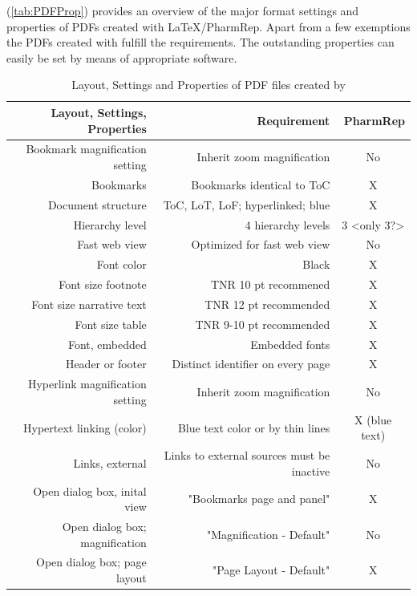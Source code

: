 (\autoref{tab:PDFProp}) provides an overview of the major format settings and properties of PDFs created with \LaTeX{}/PharmRep. Apart from a few exemptions the PDFs created with \PharmRep fulfill the requirements. The outstanding properties can easily be set by means of appropriate software.
\begin{table}[htbp]
\centering
\caption{Layout, Settings and Properties of PDF files created by \PharmRep}\label{tab:PDFProp}
\begin{tabular}{rrr}
\toprule
Layout, Settings, Properties & Requirement & PharmRep \\
\midrule
Bookmark magnification setting  & Inherit zoom magnification & \multicolumn{1}{c}{No} \\
Bookmarks & Bookmarks identical to ToC & \multicolumn{1}{c}{X} \\
Document structure & ToC, LoT, LoF; hyperlinked; blue  & \multicolumn{1}{c}{X} \\
Hierarchy level & 4 hierarchy levels & \multicolumn{1}{c}{3 <only 3?>} \\
Fast web view  & Optimized for fast web view & \multicolumn{1}{c}{No} \\
Font color & Black  & \multicolumn{1}{c}{X} \\
Font size footnote & TNR 10 pt recommened & \multicolumn{1}{c}{X} \\
Font size narrative text & TNR 12 pt recommended & \multicolumn{1}{c}{X} \\
Font size table & TNR 9-10 pt recommended & \multicolumn{1}{c}{X} \\
Font, embedded & Embedded fonts  & \multicolumn{1}{c}{X} \\
Header or footer & Distinct identifier on every page & \multicolumn{1}{c}{X} \\
Hyperlink magnification setting & Inherit zoom magnification & \multicolumn{1}{c}{No} \\
Hypertext linking (color) & Blue text color or by thin lines  & \multicolumn{1}{c}{X (blue text)} \\
Links, external & Links to external sources must be inactive  & \multicolumn{1}{c}{No} \\
Open dialog box, inital view & "Bookmarks page and panel"  & \multicolumn{1}{c}{X} \\
Open dialog box; magnification & "Magnification - Default" & \multicolumn{1}{c}{No } \\
Open dialog box; page layout & "Page Layout - Default" & \multicolumn{1}{c}{X} \\

\end{tabular}
\end{table}
